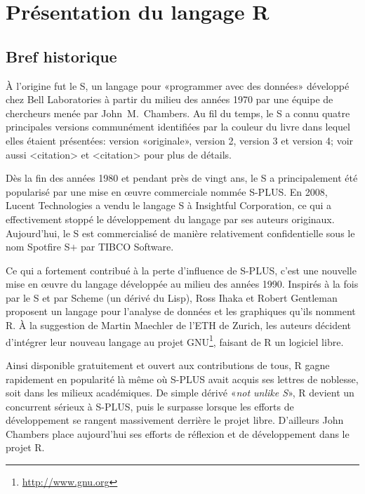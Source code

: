 \documentclass[11pt,article]{memoir}
\begin{document}
\chapter{Présentation du langage R}
\label{presentation}

\section{Bref historique}
\label{presentation:historique}

À l'origine fut le S, un langage pour «programmer avec des
données» développé chez Bell Laboratories à partir du milieu des
années 1970 par une équipe de chercheurs menée par John~M.\ Chambers.
Au fil du temps, le S a connu quatre principales versions communément
identifiées par la couleur du livre dans lequel elles étaient
présentées: %
version «originale», %
version 2, %
version 3 et %
version 4; %
voir aussi <citation> et <citation> pour plus de détails.

Dès la fin des années 1980 et pendant près de vingt ans, le S a
principalement été popularisé par une mise en {\oe}uvre commerciale
nommée S-PLUS. En 2008, Lucent Technologies a vendu le
langage S à Insightful Corporation, ce qui a effectivement stoppé le
développement du langage par ses auteurs originaux. Aujourd'hui, le S
est commercialisé de manière relativement confidentielle sous le nom
Spotfire S$+$ par TIBCO Software.

Ce qui a fortement contribué à la perte d'influence de S-PLUS, c'est
une nouvelle mise en {\oe}uvre du langage développée au milieu des
années 1990. Inspirés à la fois par le S et par
Scheme (un dérivé du Lisp), Ross Ihaka et Robert
Gentleman proposent un langage pour l'analyse de données et les
graphiques qu'ils nomment R. À la suggestion
de Martin Maechler de l'ETH de Zurich, les auteurs décident d'intégrer
leur nouveau langage au projet GNU\footnote{%
  \url{http://www.gnu.org}}, %
faisant de R un logiciel libre.

Ainsi disponible gratuitement et ouvert aux contributions de tous,
R gagne rapidement en popularité là même où S-PLUS avait acquis ses
lettres de noblesse, soit dans les milieux académiques. De simple
dérivé «\emph{not unlike S}», R devient un concurrent sérieux à
S-PLUS, puis le surpasse lorsque les efforts de développement se
rangent massivement derrière le projet libre. D'ailleurs John Chambers
place aujourd'hui ses efforts de réflexion et de développement dans le
projet R.
\end{document}
